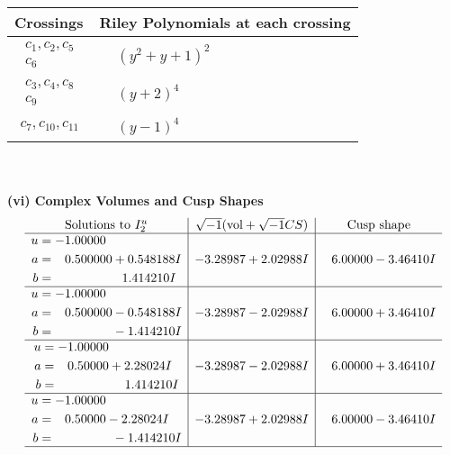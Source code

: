 \documentclass[1p]{elsarticle_modified}
\theoremstyle{definition}
\newcommand{\I}{\sqrt{-1}}
\begin{document}
\begin{tabular}{m{50pt}|m{274pt}}
Crossings & \hspace{64pt}Riley Polynomials at each crossing \\
\hline $$\begin{aligned}c_{1},c_{2},c_{5}\\c_{6}\end{aligned}$$&$\begin{aligned}
&(y^2+y+1)^2
\end{aligned}$\\
\hline $$\begin{aligned}c_{3},c_{4},c_{8}\\c_{9}\end{aligned}$$&$\begin{aligned}
&(y+2)^4
\end{aligned}$\\
\hline $$\begin{aligned}c_{7},c_{10},c_{11}\end{aligned}$$&$\begin{aligned}
&(y-1)^4
\end{aligned}$\\
\hline
\end{tabular}\\~\\
\newpage\flushleft \textbf{(vi) Complex Volumes and Cusp Shapes}
$$\begin{array}{c|c|c}  
\text{Solutions to }I^u_{2}& \I (\text{vol} + \sqrt{-1}CS) & \text{Cusp shape}\\
 \hline 
\begin{aligned}
u &= -1.00000\phantom{ +0.000000I} \\
a &= \phantom{-}0.500000 + 0.548188 I \\
b &= \phantom{-0.000000 -}1.414210 I\end{aligned}
 & -3.28987 + 2.02988 I & \phantom{-}6.00000 - 3.46410 I \\ \hline\begin{aligned}
u &= -1.00000\phantom{ +0.000000I} \\
a &= \phantom{-}0.500000 - 0.548188 I \\
b &= \phantom{-0.000000 } -1.414210 I\end{aligned}
 & -3.28987 - 2.02988 I & \phantom{-}6.00000 + 3.46410 I \\ \hline\begin{aligned}
u &= -1.00000\phantom{ +0.000000I} \\
a &= \phantom{-}0.50000 + 2.28024 I \\
b &= \phantom{-0.000000 -}1.414210 I\end{aligned}
 & -3.28987 - 2.02988 I & \phantom{-}6.00000 + 3.46410 I \\ \hline\begin{aligned}
u &= -1.00000\phantom{ +0.000000I} \\
a &= \phantom{-}0.50000 - 2.28024 I \\
b &= \phantom{-0.000000 } -1.414210 I\end{aligned}
 & -3.28987 + 2.02988 I & \phantom{-}6.00000 - 3.46410 I\\
 \hline 
 \end{array}$$\newpage\newpage\renewcommand{\arraystretch}{1}
\end{document}
